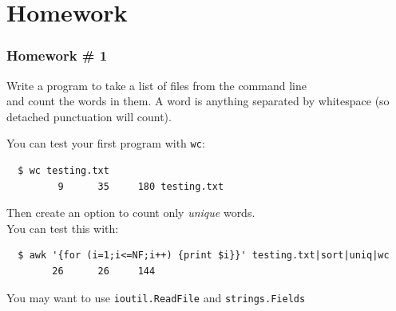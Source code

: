 \documentclass[handout,compress,t,11pt]{beamer}
\begin{document}
\section{Homework}
\begin{frame}[fragile]
    \frametitle{Homework \# 1}
    Write a program to take a list of files from the command line \\
    and count the words in them. A word is anything separated by whitespace 
    (so detached punctuation will count). \par
    \vspace{0.5\baselineskip}
    You can test your first program with \verb|wc|: \par
    {\scriptsize
\begin{verbatim}
  $ wc testing.txt
         9      35     180 testing.txt
\end{verbatim}} \par
    \vspace{0.5\baselineskip}
    Then create an option to count only {\em unique} words. \\
    You can test this with: \par
    {\scriptsize
\begin{verbatim}
  $ awk '{for (i=1;i<=NF;i++) {print $i}}' testing.txt|sort|uniq|wc
        26      26     144
\end{verbatim}} \par
    \vspace{0.5\baselineskip}
    You may want to use \verb|ioutil.ReadFile| and \verb|strings.Fields|
\end{frame}
\end{document}
